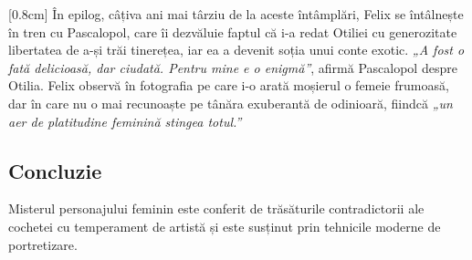 [0.8cm]
În epilog, câțiva ani mai târziu de la aceste întâmplări, Felix se întâlnește în tren cu Pascalopol, care îi dezvăluie faptul că i-a redat Otiliei cu generozitate libertatea de a-și trăi tinerețea, iar ea a devenit soția unui conte exotic. \textit{„A fost o fată delicioasă, dar ciudată. Pentru mine e o enigmă”}, afirmă Pascalopol despre Otilia. Felix observă în fotografia pe care i-o arată moșierul o femeie frumoasă, dar în care nu o mai recunoaște pe tânăra exuberantă de odinioară, fiindcă \textit{„un aer de platitudine feminină stingea totul.”}


\subsection{Concluzie}

Misterul personajului feminin este conferit de trăsăturile contradictorii ale cochetei cu temperament de artistă și este susținut prin tehnicile moderne de portretizare.

